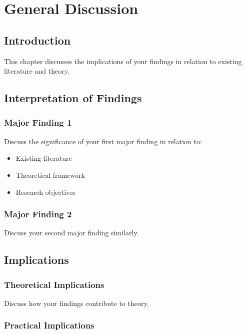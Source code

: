 
\chapter{General Discussion}

\section{Introduction}

This chapter discusses the implications of your findings in relation to existing literature and theory.

\section{Interpretation of Findings}

\subsection{Major Finding 1}

Discuss the significance of your first major finding in relation to:
\begin{itemize}
    \item Existing literature
    \item Theoretical framework
    \item Research objectives
\end{itemize}

\subsection{Major Finding 2}

Discuss your second major finding similarly.

\section{Implications}

\subsection{Theoretical Implications}

Discuss how your findings contribute to theory.

\subsection{Practical Implications}

